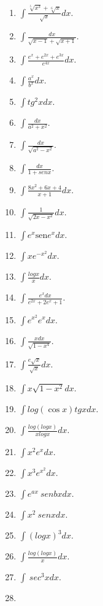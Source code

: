 \documentclass[12pt,]{article}
\begin{document}
\begin{enumerate}
\def\labelenumi{\arabic{enumi}.}
\item
  \(\displaystyle\int\frac{\sqrt[5]{x^3}+\sqrt[6]{x}}{\sqrt{x}}dx.\)
\item
  \(\displaystyle\int\frac{dx}{\sqrt{x-1}+\sqrt{x+1}}.\)
\item
  \(\displaystyle\int\frac{e^x+e^{2x}+e^{3x}}{e^{4x}}dx.\)
\item
  \(\displaystyle\int\frac{a^x}{b^x}dx.\)
\item
  \(\displaystyle\int tg^2 x dx.\)
\item
  \(\displaystyle\int\frac{dx}{a^2+x^2}.\)
\item
  \(\displaystyle\int\frac{dx}{\sqrt{a^2-x^2}}.\)
\item
  \(\displaystyle\int\frac{dx}{1+senx}.\)
\item
  \(\displaystyle\int\frac{8x^2+6x+4}{x+1}dx.\)
\item
  \(\displaystyle\int\frac{1}{\sqrt{2x-x^2}}dx.\)
\item
  \(\displaystyle\int e^x\text{sen}e^xdx.\)
\item
  \(\displaystyle\int xe^{-x^2}dx.\)
\item
  \(\displaystyle\int\frac{logx}{x}dx.\)
\item
  \(\displaystyle\int\frac{e^x dx}{e^{2x}+2e^x+1}.\)
\item
  \(\displaystyle\int e^{x^2}e^x dx.\)
\item
  \(\displaystyle\int\frac{x dx}{\sqrt{1-x^4}}.\)
\item
  \(\displaystyle\int\frac{e\sqrt{x}}{\sqrt{x}}dx.\)
\item
  \(\displaystyle\int x\sqrt{1-x^2}dx.\)
\item
  \(\displaystyle\int log(\cos x) tg x dx.\)
\item
  \(\displaystyle\int\frac{log(log x)}{x log x}dx.\)
\item
  \(\displaystyle\int x^2e^xdx.\)
\item
  \(\displaystyle\int x^3e^{x^2}dx.\)
\item
  \(\displaystyle\int e^{ax}\ sen bx dx.\)
\item
  \(\displaystyle\int x^2\ senx dx.\)
\item
  \(\displaystyle\int (log x)^3dx.\)
\item
  \(\displaystyle\int\frac{log(log x)}{x}dx.\)
\item
  \(\displaystyle\int \ sec^3 x dx.\)
\item

\end{enumerate}
\end{document}
